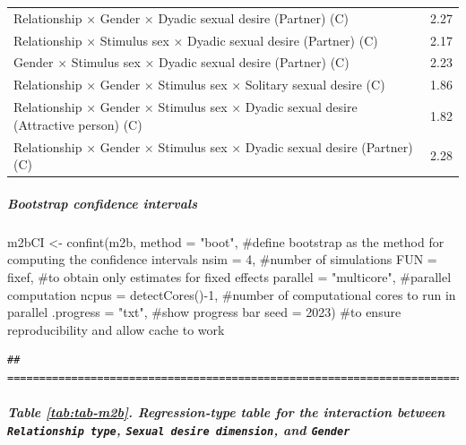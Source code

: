 \documentclass[
  bookmarksnumbered]{article}
\newenvironment{Shaded}{\begin{snugshade}}{\end{snugshade}}
\newcommand{\AttributeTok}[1]{\textcolor[rgb]{0.80,0.80,0.80}{#1}}
\newcommand{\CommentTok}[1]{\textcolor[rgb]{0.50,0.62,0.50}{#1}}
\newcommand{\DecValTok}[1]{\textcolor[rgb]{0.86,0.86,0.80}{#1}}
\newcommand{\FunctionTok}[1]{\textcolor[rgb]{0.94,0.94,0.56}{#1}}
\newcommand{\NormalTok}[1]{\textcolor[rgb]{0.80,0.80,0.80}{#1}}
\newcommand{\OtherTok}[1]{\textcolor[rgb]{0.94,0.94,0.56}{#1}}
\newcommand{\SpecialCharTok}[1]{\textcolor[rgb]{0.86,0.64,0.64}{#1}}
\newcommand{\StringTok}[1]{\textcolor[rgb]{0.80,0.58,0.58}{#1}}
\begin{document}
\begin{table}[H]
\begin{tabular}[t]{lc}
Relationship × Gender × Dyadic sexual desire (Partner) (C) & 2.27\\
Relationship × Stimulus sex × Dyadic sexual desire (Partner) (C) & 2.17\\
Gender × Stimulus sex × Dyadic sexual desire (Partner) (C) & 2.23\\
Relationship × Gender × Stimulus sex × Solitary sexual desire (C) & 1.86\\
Relationship × Gender × Stimulus sex × Dyadic sexual desire (Attractive person) (C) & 1.82\\
Relationship × Gender × Stimulus sex × Dyadic sexual desire (Partner) (C) & 2.28\\
\bottomrule
\end{tabular}
\end{table}

\hypertarget{bootstrap-confidence-intervals-1}{%
\subparagraph{Bootstrap confidence intervals}\label{bootstrap-confidence-intervals-1}}

\begin{Shaded}
\begin{Highlighting}[]
\NormalTok{m2bCI }\OtherTok{\textless{}{-}} \FunctionTok{confint}\NormalTok{(m2b, }
                 \AttributeTok{method =} \StringTok{"boot"}\NormalTok{, }\CommentTok{\#define bootstrap as the method for computing the confidence intervals}
                 \AttributeTok{nsim =} \DecValTok{4}\NormalTok{, }\CommentTok{\#number of simulations}
                 \AttributeTok{FUN =}\NormalTok{ fixef, }\CommentTok{\#to obtain only estimates for fixed effects}
                 \AttributeTok{parallel =} \StringTok{"multicore"}\NormalTok{, }\CommentTok{\#parallel computation}
                 \AttributeTok{ncpus =} \FunctionTok{detectCores}\NormalTok{()}\SpecialCharTok{{-}}\DecValTok{1}\NormalTok{, }\CommentTok{\#number of computational cores to run in parallel}
                 \AttributeTok{.progress =} \StringTok{"txt"}\NormalTok{, }\CommentTok{\#show progress bar}
                 \AttributeTok{seed =} \DecValTok{2023}\NormalTok{) }\CommentTok{\#to ensure reproducibility and allow cache to work}
\end{Highlighting}
\end{Shaded}

\begin{verbatim}
## ================================================================================
\end{verbatim}

\hypertarget{table-reftabtab-m2b.-regression-type-table-for-the-interaction-between-relationship-type-sexual-desire-dimension-and-gender}{%
\subparagraph{\texorpdfstring{Table \ref{tab:tab-m2b}. Regression-type table for the interaction between \texttt{Relationship\ type}, \texttt{Sexual\ desire\ dimension}, and \texttt{Gender}}{Table \ref{tab:tab-m2b}. Regression-type table for the interaction between Relationship type, Sexual desire dimension, and Gender}}\label{table-reftabtab-m2b.-regression-type-table-for-the-interaction-between-relationship-type-sexual-desire-dimension-and-gender}}
\end{document}

